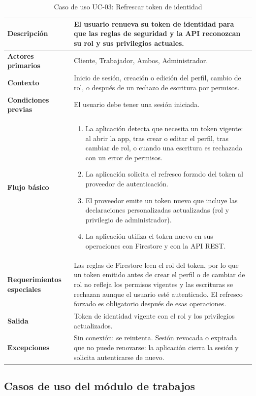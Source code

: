 \documentclass[doc,12pt,a4paper]{apa7}
\begin{document}
\begin{longtable}{|P{3.3cm}|L{11.2cm}|}
\caption{Caso de uso UC-03: Refrescar token de identidad}\\
\hline
\textbf{Descripción} & El usuario renueva su token de identidad para que las reglas de seguridad y la API reconozcan su rol y sus privilegios actuales. \\ \hline
\textbf{Actores primarios} & Cliente, Trabajador, Ambos, Administrador. \\ \hline
\textbf{Contexto} & Inicio de sesión, creación o edición del perfil, cambio de rol, o después de un rechazo de escritura por permisos. \\ \hline
\textbf{Condiciones previas} & El usuario debe tener una sesión iniciada. \\ \hline
\textbf{Flujo básico} &
\begin{enumerate}
    \item La aplicación detecta que necesita un token vigente: al abrir la app, tras crear o editar el perfil, tras cambiar de rol, o cuando una escritura es rechazada con un error de permisos.
    \item La aplicación solicita el refresco forzado del token al proveedor de autenticación.
    \item El proveedor emite un token nuevo que incluye las declaraciones personalizadas actualizadas (rol y privilegio de administrador).
    \item La aplicación utiliza el token nuevo en sus operaciones con Firestore y con la API REST.
\end{enumerate} \\ \hline
\textbf{Requerimientos especiales} & Las reglas de Firestore leen el rol del token, por lo que un token emitido antes de crear el perfil o de cambiar de rol no refleja los permisos vigentes y las escrituras se rechazan aunque el usuario esté autenticado. El refresco forzado es obligatorio después de esas operaciones. \\ \hline
\textbf{Salida} & Token de identidad vigente con el rol y los privilegios actualizados. \\ \hline
\textbf{Excepciones} & Sin conexión: se reintenta. Sesión revocada o expirada que no puede renovarse: la aplicación cierra la sesión y solicita autenticarse de nuevo. \\ \hline
\end{longtable}

\subsection{Casos de uso del módulo de trabajos}
\end{document}
